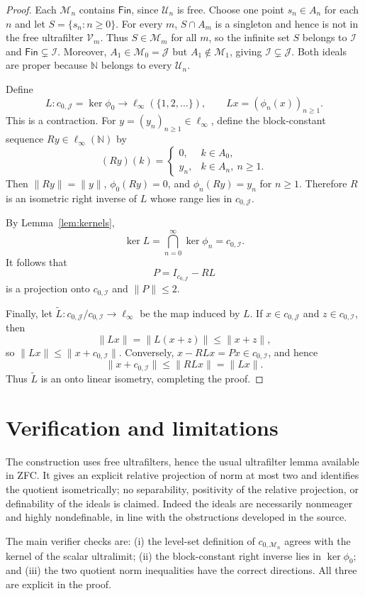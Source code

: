 \documentclass[10pt]{article}
\newcommand{\N}{\mathbb N}
\newcommand{\I}{\mathcal I}
\newcommand{\J}{\mathcal J}
\newcommand{\M}{\mathcal M}
\newcommand{\U}{\mathcal U}
\newcommand{\Fin}{\mathsf{Fin}}
\newcommand{\linf}{\ell_\infty}
\begin{document}
\begin{proof}
Each $\M_n$ contains $\Fin$, since $\U_n$ is free.  Choose one point
$s_n\in A_n$ for each $n$ and let $S=\{s_n:n\geq0\}$.  For every $m$,
$S\cap A_m$ is a singleton and hence is not in the free ultrafilter
$\mathcal V_m$.  Thus $S\in\M_m$ for all $m$, so the infinite set $S$
belongs to $\I$ and $\Fin\subsetneq\I$.  Moreover, $A_1\in\M_0=\J$ but
$A_1\notin\M_1$, giving $\I\subsetneq\J$.  Both ideals are proper because
$\N$ belongs to every $\U_n$.

Define
\[
 L:c_{0,\J}=\ker\phi_0\longrightarrow\linf(\{1,2,\ldots\}),
 \qquad
 Lx=(\phi_n(x))_{n\geq1}.
 \tag{3}\label{eq:L}
\]
This is a contraction.  For $y=(y_n)_{n\geq1}\in\linf$, define the
block-constant sequence $Ry\in\linf(\N)$ by
\[
 (Ry)(k)=
 \begin{cases}
 0,&k\in A_0,\\
 y_n,&k\in A_n,\ n\geq1.
 \end{cases}
 \tag{4}\label{eq:R}
\]
Then $\|Ry\|=\|y\|$, $\phi_0(Ry)=0$, and
$\phi_n(Ry)=y_n$ for $n\geq1$.  Therefore $R$ is an isometric right inverse
of $L$ whose range lies in $c_{0,\J}$.

By Lemma~\ref{lem:kernels},
\[
 \ker L=\bigcap_{n=0}^{\infty}\ker\phi_n=c_{0,\I}.
\]
It follows that
\[
 P=I_{c_{0,\J}}-RL
 \tag{5}\label{eq:P}
\]
is a projection onto $c_{0,\I}$ and $\|P\|\leq2$.

Finally, let $\widetilde L:c_{0,\J}/c_{0,\I}\to\linf$ be the map induced
by $L$.  If $x\in c_{0,\J}$ and $z\in c_{0,\I}$, then
\[
 \|Lx\|=\|L(x+z)\|\leq\|x+z\|,
\]
so $\|Lx\|\leq\|x+c_{0,\I}\|$.  Conversely,
$x-RLx=Px\in c_{0,\I}$, and hence
\[
 \|x+c_{0,\I}\|
 \leq\|RLx\|=\|Lx\|.
\]
Thus $\widetilde L$ is an onto linear isometry, completing the proof.
\end{proof}

\section{Verification and limitations}

The construction uses free ultrafilters, hence the usual ultrafilter lemma
available in ZFC.  It gives an explicit relative projection of norm at most
two and identifies the quotient isometrically; no separability, positivity
of the relative projection, or definability of the ideals is claimed.
Indeed the ideals are necessarily nonmeager and highly nondefinable, in line
with the obstructions developed in the source.

The main verifier checks are: (i) the level-set definition of
$c_{0,\M_n}$ agrees with the kernel of the scalar ultralimit; (ii) the
block-constant right inverse lies in $\ker\phi_0$; and (iii) the two quotient
norm inequalities have the correct directions.  All three are explicit in
the proof.
\end{document}
